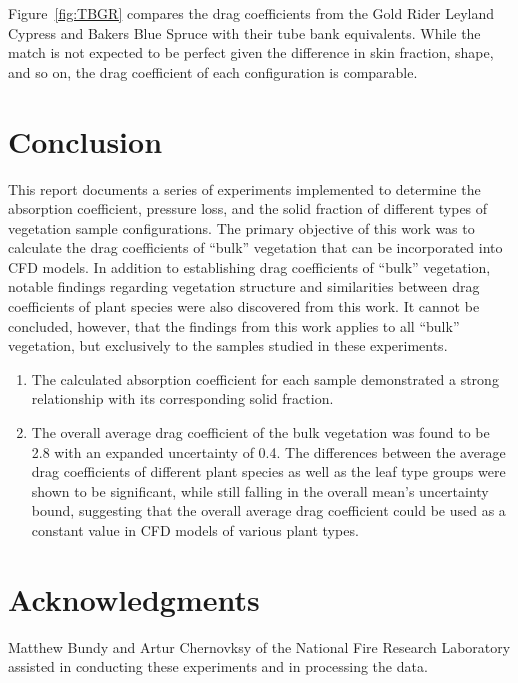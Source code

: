 \documentclass[12pt]{article}
\begin{document}
Figure~\ref{fig:TBGR} compares the drag coefficients from the Gold Rider Leyland Cypress and Bakers Blue Spruce with their tube bank equivalents. While the match is not expected to be perfect given the difference in skin fraction, shape, and so on, the drag coefficient of each configuration is comparable.
\pagebreak

\section{Conclusion}

This report documents a series of experiments implemented to determine the absorption coefficient, pressure loss, and the solid fraction of different types of vegetation sample configurations. The primary objective of this work was to calculate the drag coefficients of ``bulk'' vegetation that can be incorporated into CFD models. In addition to establishing drag coefficients of ``bulk''  vegetation, notable findings regarding vegetation structure and similarities between drag coefficients of plant species were also discovered from this work. It cannot be concluded, however, that the findings from this work applies to all ``bulk'' vegetation, but exclusively to the samples studied in these experiments.

\begin{enumerate}
  \item The calculated absorption coefficient for each sample demonstrated a strong relationship with its corresponding solid fraction.
  \item The overall average drag coefficient of the bulk vegetation was found to be 2.8 with an expanded uncertainty of 0.4. The differences between the average drag coefficients of different plant species as well as the leaf type groups were shown to be significant, while still falling in the overall mean's uncertainty bound, suggesting that the overall average drag coefficient could be used as a constant value in CFD models of various plant types.
\end{enumerate}

\section*{Acknowledgments}

\noindent Matthew Bundy and Artur Chernovksy of the National Fire Research Laboratory assisted in conducting these experiments and in processing the data.   \\
\pagebreak
\end{document}
